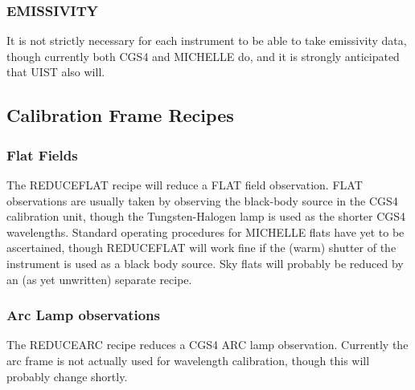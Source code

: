 \documentclass[twoside,11pt]{article}
\renewcommand{\_}{\texttt{\symbol{95}}}
\begin{document}




\subsubsection{EMISSIVITY}

It is not strictly necessary for each instrument to be able to take
emissivity data, though currently both CGS4 and MICHELLE do, and it is
strongly anticipated that UIST also will.



\subsection{Calibration Frame Recipes}

\subsubsection{Flat Fields}

The REDUCE\_FLAT recipe will reduce a FLAT field observation. FLAT
observations are usually taken by observing the black-body source in
the CGS4 calibration unit, though the Tungsten-Halogen lamp is used as
the shorter CGS4 wavelengths. Standard operating procedures for
MICHELLE flats have yet to be ascertained, though REDUCE\_FLAT will
work fine if the (warm) shutter of the instrument is used as a black
body source. Sky flats will probably be reduced by an (as yet
unwritten) separate recipe.



\subsubsection{Arc Lamp observations}

The REDUCE\_ARC recipe reduces a CGS4 ARC lamp observation. Currently
the arc frame is not actually used for wavelength calibration, though
this will probably change shortly.

\end{document}
